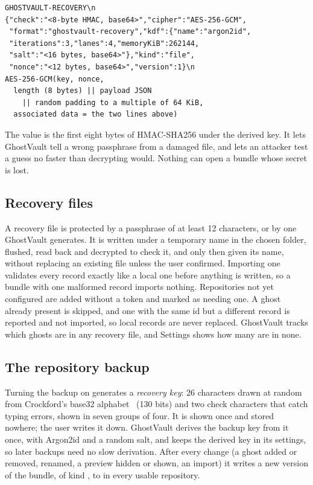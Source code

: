 \begin{lstlisting}[caption={A recovery bundle; the header is shown wrapped.},label={lst:bundle}]
GHOSTVAULT-RECOVERY\n
{"check":"<8-byte HMAC, base64>","cipher":"AES-256-GCM",
 "format":"ghostvault-recovery","kdf":{"name":"argon2id",
 "iterations":3,"lanes":4,"memoryKiB":262144,
 "salt":"<16 bytes, base64>"},"kind":"file",
 "nonce":"<12 bytes, base64>","version":1}\n
AES-256-GCM(key, nonce,
  length (8 bytes) || payload JSON
    || random padding to a multiple of 64 KiB,
  associated data = the two lines above)
\end{lstlisting}

The  value is the first eight bytes of HMAC-SHA256 under the derived key. It lets
GhostVault tell a wrong passphrase from a damaged file, and lets an attacker test a guess no faster
than decrypting would. Nothing can open a bundle whose secret is lost.

\subsection{Recovery files}
A recovery file is protected by a passphrase of at least 12 characters, or by one GhostVault
generates. It is written under a temporary name in the chosen folder, flushed, read back and
decrypted to check it, and only then given its name, without replacing an existing file unless the
user confirmed. Importing one validates every record exactly like a local one before anything is
written, so a bundle with one malformed record imports nothing. Repositories not yet configured are
added without a token and marked as needing one. A ghost already present is skipped, and one with the
same id but a different record is reported and not imported, so local records are never replaced.
GhostVault tracks which ghosts are in any recovery file, and Settings shows how many are in none.

\subsection{The repository backup}
Turning the backup on generates a \emph{recovery key}: 26 characters drawn at random from Crockford's
base32 alphabet~\cite{crockford} (130 bits) and two check characters that catch typing errors, shown
in seven groups of four. It is shown once and stored nowhere; the user writes it down. GhostVault
derives the backup key from it once, with Argon2id and a random salt, and keeps the derived key in its
settings, so later backups need no slow derivation. After every change (a ghost added or removed,
renamed, a preview hidden or shown, an import) it writes a new version of the bundle, of kind
, to  in every usable repository.

